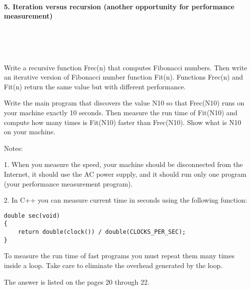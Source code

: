 \documentclass{article}
\begin{document}
	
	\rmfamily
	
	\paragraph{5. Iteration versus recursion (another opportunity for performance measurement) }\
	
	\rmfamily\
	
		Write a recursive function Frec(n) that computes Fibonacci numbers. Then write an iterative version of Fibonacci number function Fit(n). Functions Frec(n) and Fit(n) return the same value but with different performance.
		\newline
		
		Write the main program that discovers the value N10 so that Frec(N10) runs on your machine exactly 10 seconds. Then measure the run time of Fit(N10) and compute how many times is Fit(N10) faster than Frec(N10). Show what is N10 on your machine.
		\newline
		
		\noindent Notes:
		
		1. When you measure the speed, your machine should be disconnected from the Internet, it should use the AC power supply, and it should run only one program (your performance measurement program).
		
		2. In C++ you can measure current time in seconds using the following function:
		
		\begin{verbatim}
double sec(void)
{
    return double(clock()) / double(CLOCKS_PER_SEC);
}
		\end{verbatim}
		
		To measure the run time of fast programs you must repeat them many times inside a loop. Take care to eliminate the overhead generated by the loop.
		\newline
		
		The answer is listed on the pages 20 through 22.

\paragraph{}\
\paragraph{}\
\end{document}
